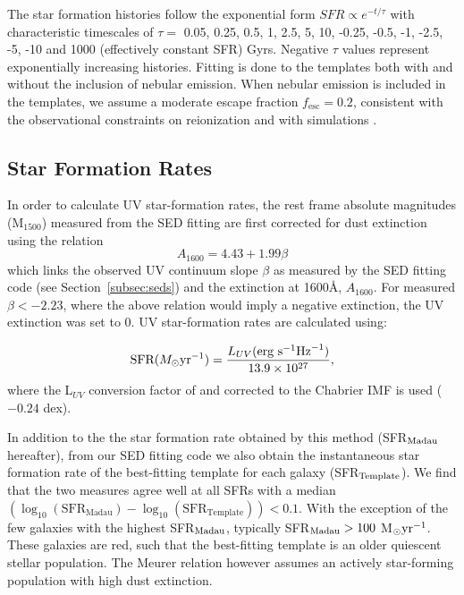The star formation histories follow the exponential form $SFR \propto e^{-t/\tau}$ with characteristic timescales of $\tau = $ 0.05, 0.25, 0.5, 1, 2.5, 5, 10, -0.25, -0.5, -1, -2.5, -5, -10 and 1000 (effectively constant SFR) Gyrs. Negative $\tau$ values represent exponentially increasing histories. Fitting is done to the templates both with and without the inclusion of nebular emission. When nebular emission is included in the templates, we assume a moderate escape fraction $f_{\text{esc}} = 0.2$, consistent with the observational constraints on reionization and with simulations \citep{Yajima:2010fb,Fernandez:2011cw,Finkelstein:2012hr,Robertson:2013ji}.

\subsection{Star Formation Rates}\label{sec:SFR}
In order to calculate UV star-formation rates, the rest frame absolute magnitudes (M$_{1500}$) measured from the SED fitting are first corrected for dust extinction using the \citet{Meurer:1999jm} relation
\begin{equation}
A_{1600} = 4.43 + 1.99\beta
\end{equation}
which links the observed UV continuum slope $\beta$ as measured by the SED fitting code (see Section~\ref{subsec:seds}) and the extinction at 1600\AA, $A_{1600}$. For measured $\beta < - 2.23$, where the above relation would imply a negative extinction, the UV extinction was set to 0. UV star-formation rates are calculated using: 

\begin{equation}\label{eq:sfr}
  \textup{SFR} (M_{\odot} \textup{yr}^{-1}) = 
    \frac{L_{UV} (\textup{erg s}^{-1} \textup{Hz}^{-1})} {13.9 \times 10^{27}} ,
\end{equation}
where the L$_{UV}$ conversion factor of \citet{Madau:1998jd} and \citet{KennicuttJr:1998id} corrected to the Chabrier IMF is used ($-0.24$ dex).

In addition to the the star formation rate obtained by this method (SFR$_{\rm{Madau}}$ hereafter), from our SED fitting code we also obtain the instantaneous star formation rate of the best-fitting template for each galaxy (SFR$_{\rm{Template}}$). We find that the two measures agree well at all SFRs with a median$(\log_{10}(\text{SFR}_{\text{Madau}}) - \log_{10}(\text{SFR}_{\text{Template}})) < 0.1$. With the exception of the few galaxies with the highest SFR$_{\rm{Madau}}$, typically SFR$_{\rm{Madau}} > 100$ M$_{\odot} \textup{yr}^{-1}$. These galaxies are red, such that the best-fitting template is an older quiescent stellar population. The Meurer relation however assumes an actively star-forming population with high dust extinction.

